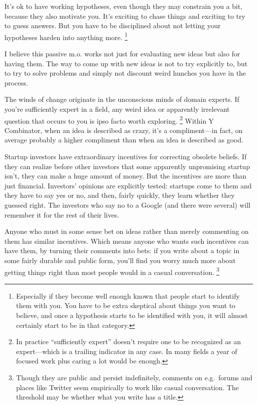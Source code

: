 It's ok to have working hypotheses, even though they may constrain you a
bit, because they also motivate you. It's exciting to chase things and
exciting to try to guess answers. But you have to be disciplined about
not letting your hypotheses harden into anything more.
\footnote{Especially if they become well enough known that people start to
identify them with you. You have to be extra skeptical about things you
want to believe, and once a hypothesis starts to be identified with you,
it will almost certainly start to be in that category.}

I believe this passive m.o. works not just for evaluating new ideas but
also for having them. The way to come up with new ideas is not to try
explicitly to, but to try to solve problems and simply not discount
weird hunches you have in the process.

The winds of change originate in the unconscious minds of domain
experts. If you're sufficiently expert in a field, any weird idea or
apparently irrelevant question that occurs to you is ipso facto worth
exploring. \footnote{In practice ``sufficiently expert'' doesn't require one to be
recognized as an expert---which is a trailing indicator in any case. In
many fields a year of focused work plus caring a lot would be enough.} Within Y Combinator, when an idea is
described as crazy, it's a compliment---in fact, on average probably a
higher compliment than when an idea is described as good.

Startup investors have extraordinary incentives for correcting obsolete
beliefs. If they can realize before other investors that some apparently
unpromising startup isn't, they can make a huge amount of money. But the
incentives are more than just financial. Investors' opinions are
explicitly tested: startups come to them and they have to say yes or no,
and then, fairly quickly, they learn whether they guessed right. The
investors who say no to a Google (and there were several) will remember
it for the rest of their lives.

Anyone who must in some sense bet on ideas rather than merely commenting
on them has similar incentives. Which means anyone who wants such
incentives can have them, by turning their comments into bets: if you
write about a topic in some fairly durable and public form, you'll find
you worry much more about getting things right than most people would in
a casual conversation. \footnote{Though they are public and persist indefinitely, comments on
e.g.~forums and places like Twitter seem empirically to work like casual
conversation. The threshold may be whether what you write has a title.}

